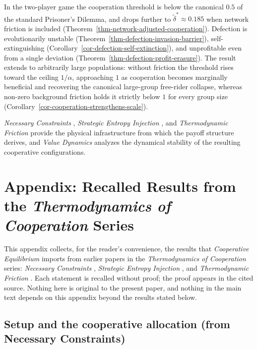 \documentclass[11pt]{article}
\theoremstyle{plain}
\theoremstyle{definition}
\theoremstyle{remark}
\let\origsection\section
\renewcommand{\section}{\needspace{12\baselineskip}\origsection}
\let\origsubsection\subsection
\renewcommand{\subsection}{\needspace{7\baselineskip}\origsubsection}
\begin{document}
In the two-player game the cooperation threshold is below the canonical
\(0.5\) of the standard Prisoner's Dilemma, and drops further to
\(\tilde{\delta}^* \approx 0.185\) when network friction is included
(Theorem~\ref{thm-network-adjusted-cooperation}). Defection is
evolutionarily unstable (Theorem~\ref{thm-defection-invasion-barrier}),
self-extinguishing (Corollary~\ref{cor-defection-self-extinction}), and
unprofitable even from a single deviation
(Theorem~\ref{thm-defection-profit-erasure}). The result extends to
arbitrarily large populations: without friction the threshold rises
toward the ceiling \(1/\alpha\), approaching \(1\) as cooperation
becomes marginally beneficial and recovering the canonical large-group
free-rider collapse, whereas non-zero background friction holds it
strictly below \(1\) for every group size
(Corollary~\ref{cor-cooperation-strengthens-scale}).

\emph{Necessary Constraints} \citep{TC-I}, \emph{Strategic Entropy
Injection} \citep{TC-II}, and \emph{Thermodynamic Friction}
\citep{TC-IV} provide the physical infrastructure from which the payoff
structure derives, and \emph{Value Dynamics} \citep{TC-VI} analyzes the
dynamical stability of the resulting cooperative configurations.

\appendix

\section{\texorpdfstring{Appendix: Recalled Results from the
\emph{Thermodynamics of Cooperation}
Series}{Appendix: Recalled Results from the Thermodynamics of Cooperation Series}}\label{appendix-recalled-results-from-the-thermodynamics-of-cooperation-series}

This appendix collects, for the reader's convenience, the results that
\emph{Cooperative Equilibrium} imports from earlier papers in the
\emph{Thermodynamics of Cooperation} series: \emph{Necessary
Constraints} \citep{TC-I}, \emph{Strategic Entropy Injection}
\citep{TC-II}, and \emph{Thermodynamic Friction} \citep{TC-IV}. Each
statement is recalled without proof; the proof appears in the cited
source. Nothing here is original to the present paper, and nothing in
the main text depends on this appendix beyond the results stated below.

\subsection{Setup and the cooperative allocation (from Necessary
Constraints)}\label{setup-and-the-cooperative-allocation-from-necessary-constraints}
\end{document}
